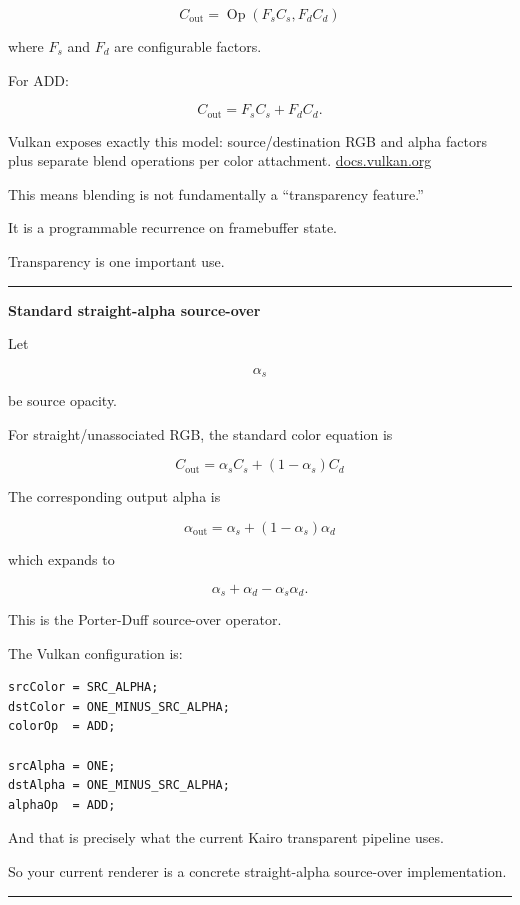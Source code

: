 \[
\boxed{
C_{\text{out}}
=
\operatorname{Op}
\left(
F_s C_s,
F_d C_d
\right)
}
\]

where \(F_s\) and \(F_d\) are configurable factors.

For ADD:

\[
C_{\text{out}}
=
F_sC_s+F_dC_d.
\]

Vulkan exposes exactly this model: source/destination RGB and alpha factors plus separate blend operations per color attachment. \href{https://docs.vulkan.org/spec/latest/chapters/framebuffer.html?utm_source=chatgpt.com}{docs.vulkan.org}

This means blending is not fundamentally a ``transparency feature.''

It is a programmable recurrence on framebuffer state.

Transparency is one important use.

\begin{center}\rule{0.5\linewidth}{0.5pt}\end{center}

\textbf{Standard straight-alpha source-over}

Let

\[
\alpha_s
\]

be source opacity.

For straight/unassociated RGB, the standard color equation is

\[
\boxed{
C_{\text{out}}
=
\alpha_s C_s
+
(1-\alpha_s)C_d
}
\]

The corresponding output alpha is

\[
\boxed{
\alpha_{\text{out}}
=
\alpha_s+
(1-\alpha_s)\alpha_d
}
\]

which expands to

\[
\alpha_s+\alpha_d-\alpha_s\alpha_d.
\]

This is the Porter-Duff source-over operator.

The Vulkan configuration is:

\begin{verbatim}
srcColor = SRC_ALPHA;
dstColor = ONE_MINUS_SRC_ALPHA;
colorOp  = ADD;

srcAlpha = ONE;
dstAlpha = ONE_MINUS_SRC_ALPHA;
alphaOp  = ADD;
\end{verbatim}

And that is precisely what the current Kairo transparent pipeline uses.

So your current renderer is a concrete straight-alpha source-over implementation.

\begin{center}\rule{0.5\linewidth}{0.5pt}\end{center}

